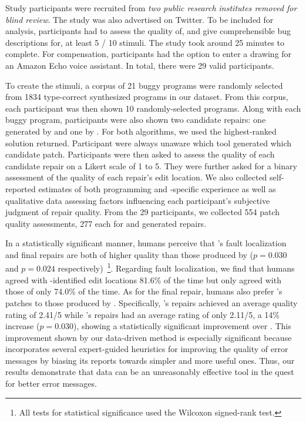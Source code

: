 %
Study participants were recruited from \emph{two public research
institutes removed for blind review}. The study was also advertised on Twitter.
To be included for analysis, participants had to assess the quality of, and give
comprehensible bug descriptions for, at least 5 / 10 stimuli. The study took around
25 minutes to complete. For compensation, participants had the option to enter a
drawing for an Amazon Echo voice assistant. In total, there were
29 valid participants.

To create the stimuli, a corpus of 21 buggy programs were randomly selected from
1834 type-correct synthesized programs in our dataset. From this corpus, each
participant was then shown 10 randomly-selected programs. Along with each buggy
program, participants were also shown two candidate repairs: one generated by
\toolname and one by \seminal. For both algorithms, we used the highest-ranked
solution returned. Participant were always unaware which tool generated which
candidate patch. Participants were then asked to assess the quality of each
candidate repair on a Likert scale of 1 to 5. They were further asked for a
binary assessment of the quality of each repair's edit location.
We also collected self-reported estimates of both programming and
\ocaml-specific experience as well as qualitative data assessing factors
influencing each participant's subjective judgment of repair quality.
From the 29 participants, we collected 554 patch quality assessments, 277 each
for \toolname and \seminal generated repairs.


%
In a statistically significant manner, humans perceive that
\toolname's fault localization and final repairs are both
of higher quality than those produced by \seminal ($p=0.030$
and $p=0.024$ respectively)~\footnote{All tests for statistical
significance used the Wilcoxon signed-rank test.}.
%
Regarding fault localization, we find that humans agreed
with \toolname-identified edit locations 81.6\% of the time
but only agreed with those of \seminal only 74.0\% of the time.
%
%
As for the final repair, humans also prefer \toolname's patches
to those produced by \seminal. Specifically, \toolname's repairs
achieved an average quality rating of 2.41/5 while \seminal's
repairs had an average rating of only 2.11/5, a 14\% increase ($p=0.030$),
showing a statistically significant improvement over \seminal.
%
This improvement shown by our data-driven method is especially
significant because \seminal incorporates several expert-guided
heuristics for improving the quality of error messages by biasing
its reports towards simpler and more useful ones.
%
Thus, our results demonstrate that data can be an unreasonably
effective tool in the quest for better error messages.

